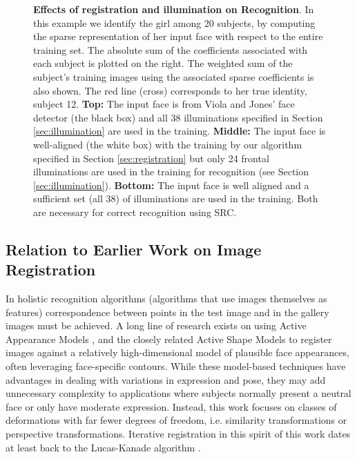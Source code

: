 \begin{figure}
\begin{tabular}{cc}
\end{tabular} \caption{\small{\bf Effects of registration and illumination on
Recognition}. In this example we identify the girl among 20 subjects, by
computing the sparse representation of her input face with respect to the
entire training set. The absolute sum of the coefficients associated with each
subject is plotted on the right. The weighted sum of the 
subject's training images using the associated sparse coefficients is also shown.
The red line (cross) corresponds to her true identity, subject 12. {\bf Top:} The
input face is from Viola and Jones' face detector (the black box) and all 38
illuminations specified in Section \ref{sec:illumination} are used in the
training.  {\bf Middle:} The input face is well-aligned (the white box) with
the training by our algorithm specified in Section \ref{sec:registration} but
only 24 frontal illuminations are used in the training for recognition (see
Section \ref{sec:illumination}). {\bf Bottom:} The input face is well aligned and
a sufficient set (all 38) of
illuminations are used in the training. Both are necessary for correct recognition
using SRC.}\label{fig:promo}
\end{figure}

\subsection{Relation to Earlier Work on Image Registration}

In holistic recognition algorithms (algorithms that use images themselves as
features) correspondence between points in the test image and in the gallery
images must be achieved.  A long line of research exists on using Active
Appearance Models \cite{Cootes2001-PAMI}, and the closely related Active Shape
Models \cite{cootes1992active} to register images against a relatively
high-dimensional model of plausible face appearances, often leveraging
face-specific contours.  While these model-based techniques have advantages in
dealing with variations in expression and pose, they may add unnecessary
complexity to applications where subjects normally present a neutral face or
only have moderate expression. Instead, this work focuses on classes of
deformations with far fewer degrees of freedom, i.e. similarity transformations
or perspective transformations.  Iterative registration in this spirit of this
work dates at least back to the Lucas-Kanade algorithm
\cite{lucas1981iterative}.

